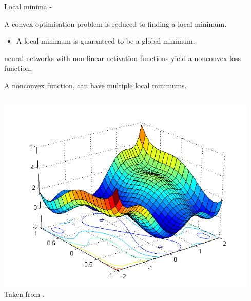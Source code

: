 

\begin{frame}[t,allowframebreaks]{
    Local minima -}

    A convex \gls{optimisation} 
    problem is reduced to finding a 
    \gls{local minimum}.
    \begin{itemize}
        \item A \gls{local minimum} is guaranteed to be a
        \gls{global minimum}.\\
    \end{itemize}

    \vspace{0.1cm}

    \Glspl{neural network} with non-linear 
    \glspl{activation function}
    yield a nonconvex \gls{loss function}.\\
    \vspace{0.1cm}

    A nonconvex function, 
    can have multiple \glspl{local minimum}.

    \begin{columns}[t]
        \begin{column}{0.40\textwidth}
            \begin{center}
                \includegraphics[width=0.98\textwidth]
                    {./images/training_issues/local_minima_illustration.png}\\
                {\tiny 
                    \color{col:attribution} 
                    Taken from \cite{StackExch:MultipleMinima}.\\    
                }
            \end{center}                        
        \end{column}
        \begin{column}{0.60\textwidth}
        \end{column}
    \end{columns}

\end{frame}